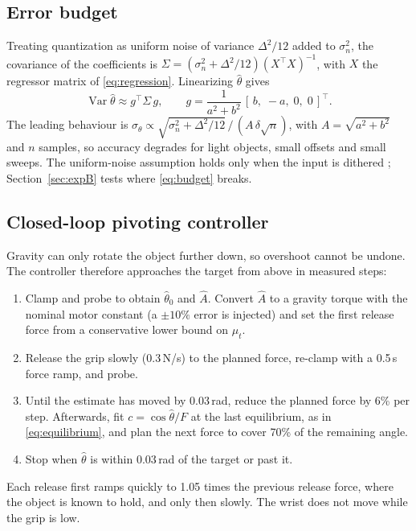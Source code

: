 \documentclass[11pt]{article}
\begin{document}
\subsection{Error budget}
Treating quantization as uniform noise of variance $\Delta^2/12$ added to $\sigma_n^2$, the covariance of the coefficients is $\Sigma = (\sigma_n^2 + \Delta^2/12)(X^\top X)^{-1}$, with $X$ the regressor matrix of \eqref{eq:regression}. Linearizing $\hat\theta$ gives
\begin{equation}
\operatorname{Var}\hat\theta \approx g^\top \Sigma\, g, \qquad g = \frac{1}{a^2+b^2}\,[\,b,\; -a,\; 0,\; 0\,]^\top. \label{eq:budget}
\end{equation}
The leading behaviour is $\sigma_\theta \propto \sqrt{\sigma_n^2+\Delta^2/12}\,/\,(A\,\delta\sqrt{n})$, with $A=\sqrt{a^2+b^2}$ and $n$ samples, so accuracy degrades for light objects, small offsets and small sweeps. The uniform-noise assumption holds only when the input is dithered \cite{gray1993}; Section~\ref{sec:expB} tests where \eqref{eq:budget} breaks.

\subsection{Closed-loop pivoting controller}\label{sec:controller}
Gravity can only rotate the object further down, so overshoot cannot be undone. The controller therefore approaches the target from above in measured steps:
\begin{enumerate}
\item Clamp and probe to obtain $\hat\theta_0$ and $\hat A$. Convert $\hat A$ to a gravity torque with the nominal motor constant (a $\pm10\%$ error is injected) and set the first release force from a conservative lower bound on $\mu_t$.
\item Release the grip slowly (0.3\,N/s) to the planned force, re-clamp with a 0.5\,s force ramp, and probe.
\item Until the estimate has moved by 0.03\,rad, reduce the planned force by 6\% per step. Afterwards, fit $c = \cos\hat\theta/F$ at the last equilibrium, as in \eqref{eq:equilibrium}, and plan the next force to cover 70\% of the remaining angle.
\item Stop when $\hat\theta$ is within 0.03\,rad of the target or past it.
\end{enumerate}
Each release first ramps quickly to 1.05 times the previous release force, where the object is known to hold, and only then slowly. The wrist does not move while the grip is low.
\end{document}
